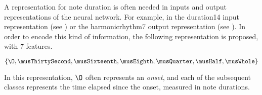 
A representation for note duration is often needed in inputs
and output representations of the neural network. For
example, in the \gls{duration14} input representation (see
) or the \gls{harmonicrhythm7} output
representation (see ). In
order to encode this kind of information, the following
representation is proposed, with 7 features.

\begin{equation}
    \{\O, \musThirtySecond, \musSixteenth, \musEighth, \musQuarter, \musHalf, \musWhole \}
\end{equation}

In this representation, $\O$ often represents an
\emph{onset}, and each of the subsequent classes represents
the time elapsed since the onset, measured in note
durations.
